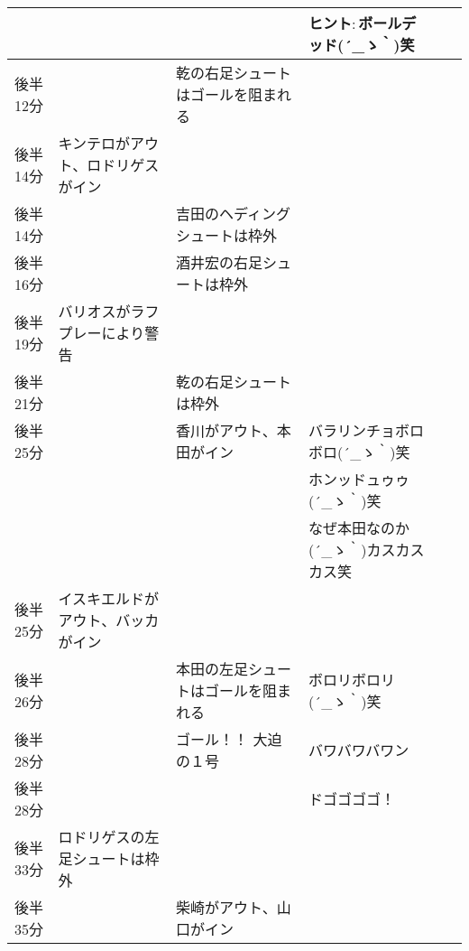 \begin{table}[htb]
{\begin{tabular}{|l|l|l|l|l|l|}
                &                                              &                                       & ヒント$:$ボールデッド\sf (´\_ゝ｀)笑 \\ \hline
      後半12分  &                                              & 乾の右足シュートはゴールを阻まれる    & \\ \hline
      後半14分  & キンテロがアウト、ロドリゲスがイン           &                                       & \\ \hline
      後半14分  &                                              & 吉田のヘディングシュートは枠外        &      \\ \hline
      後半16分  &                                              & 酒井宏の右足シュートは枠外            &   \\ \hline
      後半19分  & バリオスがラフプレーにより警告               &                                       &  \\ \hline
      後半21分  &                                              & 乾の右足シュートは枠外                & \\ \hline
      後半25分  &                                              & 香川がアウト、本田がイン              & バラリンチョボロボロ\sf (´\_ゝ｀)笑 \\ \hline
                &                                              &                                       & ホンッドュゥゥ\sf (´\_ゝ｀)笑 \\ \hline
                &                                              &                                       & なぜ本田なのか\sf (´\_ゝ｀)カスカスカス笑 \\ \hline
      後半25分  & イスキエルドがアウト、バッカがイン           &                                       &  \\ \hline
      後半26分  &                                              & 本田の左足シュートはゴールを阻まれる  & ボロリボロリ\sf (´\_ゝ｀)笑\\ \hline
      後半28分  &                                              & ゴール！！ 大迫の１号                 & バワバワバワン  \\ \hline
      後半28分  &                                              &                                       & ドゴゴゴゴ！ \\ \hline
      後半33分  & ロドリゲスの左足シュートは枠外               &                                       &   \\ \hline
      後半35分  &                                              & 柴崎がアウト、山口がイン              &   \\ \hline

\end{tabular}}
\end{table}
